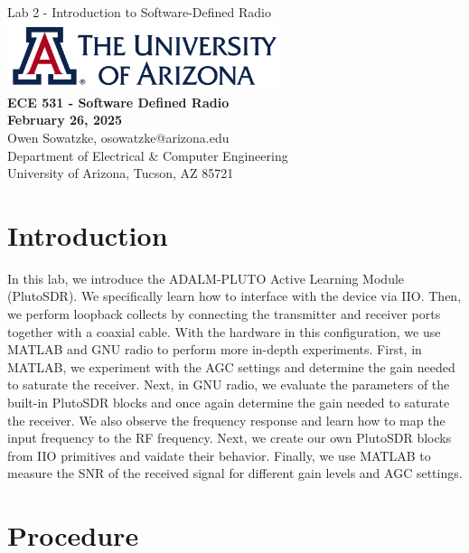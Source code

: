 \documentclass{article}
\begin{document}
\begin{titlepage}
	\centering
	{\huge Lab 2 - Introduction to Software-Defined Radio}\\[0.25 in]
	\includegraphics[width=0.6\textwidth]{ua_logo.png}\\[0.25 in]
	{\large \textbf{ECE 531 - Software Defined Radio\\[0.25 in]
	February 26, 2025\\[0.25 in]}}
	{\large Owen Sowatzke, osowatzke@arizona.edu\\[0.05 in]
	Department of Electrical \& Computer Engineering\\[0.05 in]
	University of Arizona, Tucson, AZ 85721\\[0.5 in]}
	\hypersetup{linkcolor=navy-blue}
	\noindent\hrulefill
	\tableofcontents
	\noindent\hrulefill
\end{titlepage}

\setlength{\parindent}{0pt}

\section{Introduction}

In this lab, we introduce the ADALM-PLUTO Active Learning Module (PlutoSDR). We specifically learn how to interface with the device via IIO. Then, we perform loopback collects by connecting the transmitter and receiver ports together with a coaxial cable. With the hardware in this configuration, we use MATLAB and GNU radio to perform more in-depth experiments. First, in MATLAB, we experiment with the AGC settings and determine the gain needed to saturate the receiver. Next, in GNU radio, we evaluate the parameters of the built-in PlutoSDR blocks and once again determine the gain needed to saturate the receiver. We also observe the frequency response and learn how to map the input frequency to the RF frequency. Next, we create our own PlutoSDR blocks from IIO primitives and vaidate their behavior. Finally, we use MATLAB to measure the SNR of the received signal for different gain levels and AGC settings. 

\section{Procedure}
\end{document}
